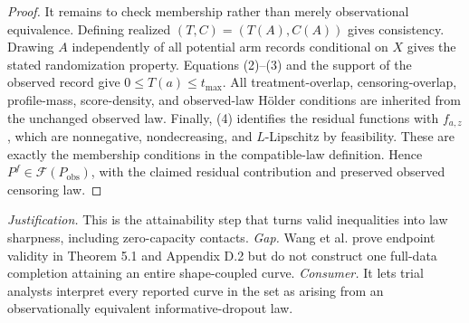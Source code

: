 \documentclass{article}
\begin{document}
\begin{proof}
It remains to check membership rather than merely observational equivalence.  Defining realized \((T,C)=(T(A),C(A))\) gives consistency.  Drawing \(A\) independently of all potential arm records conditional on \(X\) gives the stated randomization property.  Equations (2)--(3) and the support of the observed record give \(0\leq T(a)\leq t_{\max}\).  All treatment-overlap, censoring-overlap, profile-mass, score-density, and observed-law H\"older conditions are inherited from the unchanged observed law.  Finally, (4) identifies the residual functions with \(f_{a,z}\), which are nonnegative, nondecreasing, and \(L\)-Lipschitz by feasibility.  These are exactly the membership conditions in the compatible-law definition.  Hence \(P^f\in\mathcal F(P_{\mathrm{obs}})\), with the claimed residual contribution and preserved observed censoring law.
\end{proof}
\par\smallskip\noindent \textit{Justification.} This is the attainability step that turns valid inequalities into law sharpness, including zero-capacity contacts. \textit{Gap.} Wang et al. prove endpoint validity in Theorem 5.1 and Appendix D.2 but do not construct one full-data completion attaining an entire shape-coupled curve. \textit{Consumer.} It lets trial analysts interpret every reported curve in the set as arising from an observationally equivalent informative-dropout law.
\end{document}
